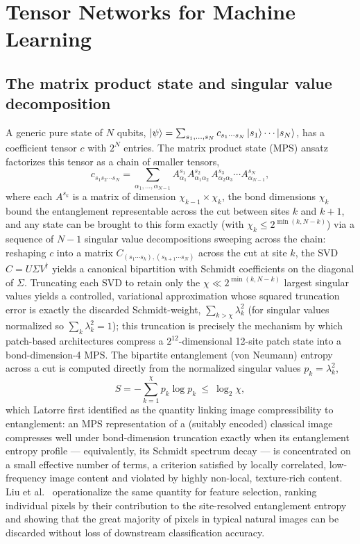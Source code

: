 \documentclass[11pt]{article}
\begin{document}
\section{Tensor Networks for Machine Learning}
\label{sec:tensor}

\subsection{The matrix product state and singular value decomposition}
A generic pure state of $N$ qubits, $\ket{\psi}=\sum_{s_1,\ldots,s_N} c_{s_1\cdots s_N}\ket{s_1}\cdots\ket{s_N}$, has a coefficient tensor $c$ with $2^N$ entries. The matrix product state (MPS) ansatz factorizes this tensor as a chain of smaller tensors,
\begin{equation}
c_{s_1 s_2\cdots s_N} = \sum_{\alpha_1,\ldots,\alpha_{N-1}} A^{s_1}_{\alpha_1} A^{s_2}_{\alpha_1\alpha_2}\, A^{s_3}_{\alpha_2\alpha_3}\cdots A^{s_N}_{\alpha_{N-1}},
\label{eq:mps}
\end{equation}
where each $A^{s_k}$ is a matrix of dimension $\chi_{k-1}\times\chi_k$, the bond dimensions $\chi_k$ bound the entanglement representable across the cut between sites $k$ and $k+1$, and any state can be brought to this form exactly (with $\chi_k \le 2^{\min(k,N-k)}$) via a sequence of $N-1$ singular value decompositions sweeping across the chain: reshaping $c$ into a matrix $C_{(s_1\cdots s_k),(s_{k+1}\cdots s_N)}$ across the cut at site $k$, the SVD $C = U\Sigma V^\dagger$ yields a canonical bipartition with Schmidt coefficients on the diagonal of $\Sigma$. Truncating each SVD to retain only the $\chi \ll 2^{\min(k,N-k)}$ largest singular values yields a controlled, variational approximation whose squared truncation error is exactly the discarded Schmidt-weight, $\sum_{k>\chi}\lambda_k^2$ (for singular values normalized so $\sum_k \lambda_k^2=1$); this truncation is precisely the mechanism by which patch-based architectures compress a $2^{12}$-dimensional 12-site patch state into a bond-dimension-4 MPS. The bipartite entanglement (von Neumann) entropy across a cut is computed directly from the normalized singular values $p_k = \lambda_k^2$,
\begin{equation}
S = -\sum_{k=1}^{\chi} p_k \log p_k \ \le\ \log_2\chi,
\label{eq:ee}
\end{equation}
which Latorre \cite{Latorre2005} first identified as the quantity linking image compressibility to entanglement: an MPS representation of a (suitably encoded) classical image compresses well under bond-dimension truncation exactly when its entanglement entropy profile — equivalently, its Schmidt spectrum decay — is concentrated on a small effective number of terms, a criterion satisfied by locally correlated, low-frequency image content and violated by highly non-local, texture-rich content. Liu et al.\ \cite{Liu2021} operationalize the same quantity for feature selection, ranking individual pixels by their contribution to the site-resolved entanglement entropy and showing that the great majority of pixels in typical natural images can be discarded without loss of downstream classification accuracy.
\end{document}
